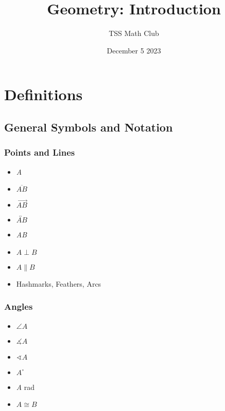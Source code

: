 \documentclass{article}
\title{Geometry: Introduction}
\author{TSS Math Club}
\date{December 5 2023}
\begin{document}
\maketitle

\section{Definitions}

    \subsection{General Symbols and Notation}
    
        \subsubsection{Points and Lines}
            \begin{itemize}
                \item \textit{A}
                \item $\overline{AB}$
                \item $\overrightarrow{AB}$
                \item $\overleftrightarrow{AB}$
                \item \textit{AB}
                \item $A \perp B$
                \item $A \parallel B$
                \item Hashmarks, Feathers, Arcs
            \end{itemize}
            
        \subsubsection{Angles}
            \begin{itemize}
                \item $\angle A$
                \item $\measuredangle A$
                \item $\sphericalangle A$
                \item $A ^\circ$
                \item \textit{A} rad
                \item $A \cong B$
            \end{itemize}
\end{document}
